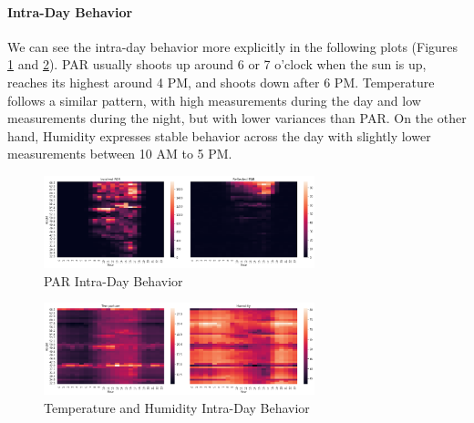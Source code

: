 \documentclass[11pt, letterpaper]{article}
\begin{document}
\paragraph{Intra-Day Behavior}
We can see the intra-day behavior more explicitly in the following plots (Figures \ref{fig:par-intra-day} and \ref{fig:th-intra-day}). PAR usually shoots up around 6 or 7 o'clock when the sun is up, reaches its highest around 4 PM, and shoots down after 6 PM. Temperature follows a similar pattern, with high measurements during the day and low measurements during the night, but with lower variances than PAR. On the other hand, Humidity expresses stable behavior across the day with slightly lower measurements between 10 AM to 5 PM.
\begin{figure}[h!]
\centering
\includegraphics[width=0.7\textwidth]{eda_3.2.png}
\captionsetup{justification=centering}
\caption{PAR Intra-Day Behavior}
\label{fig:par-intra-day}
\end{figure}
\begin{figure}[h!]
\centering
\includegraphics[width=0.7\textwidth]{eda_3.3.png}
\captionsetup{justification=centering}
\caption{Temperature and Humidity Intra-Day Behavior}
\label{fig:th-intra-day}
\end{figure}
\end{document}
